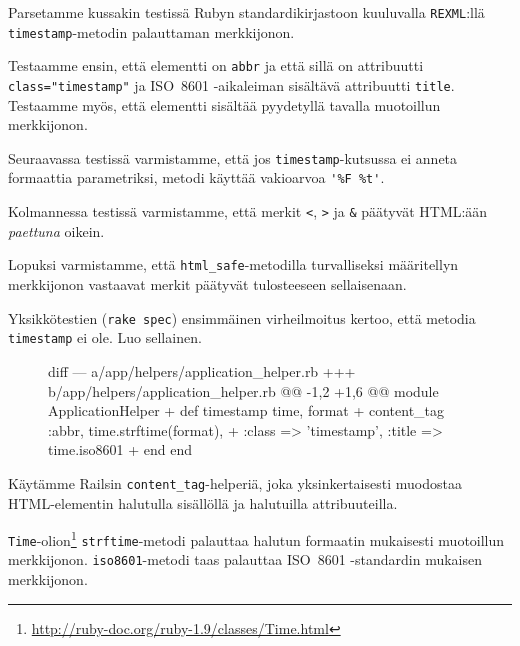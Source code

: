 \documentclass{article}
\newenvironment{myfigure}[1][tbp]{
  \begin{figure}[#1]
    \centering
    \begin{lrbox}{\myfigurebox}
      \begin{minipage}{\textwidth}
}{
      \end{minipage}
    \end{lrbox}
    \colorbox{blue!4}{\usebox{\myfigurebox}}
  \end{figure}
}
\begin{document}
Parsetamme kussakin testissä Rubyn standardikirjastoon kuuluvalla
\texttt{REXML}:llä \texttt{timestamp}-metodin palauttaman merkkijonon.

Testaamme ensin, että elementti on \texttt{abbr} ja että sillä on attribuutti
\texttt{class="timestamp"} ja ISO~8601 -aikaleiman sisältävä attribuutti
\texttt{title}. Testaamme myös, että elementti sisältää pyydetyllä tavalla
muotoillun merkkijonon.

Seuraavassa testissä varmistamme, että jos \texttt{timestamp}-kutsussa ei
anneta formaattia parametriksi, metodi käyttää vakioarvoa \verb!'%F %t'!.

Kolmannessa testissä varmistamme, että merkit \texttt{<}, \texttt{>} ja
\texttt{\&} päätyvät HTML:ään \emph{paettuna} oikein.

Lopuksi varmistamme, että \texttt{html\_safe}-metodilla turvalliseksi
määritellyn merkkijonon vastaavat merkit päätyvät tulosteeseen sellaisenaan.

\begin{samepage}
Yksikkötestien (\texttt{rake spec}) ensimmäinen virheilmoitus kertoo, että
metodia \texttt{timestamp} ei ole. Luo sellainen.

\begin{myfigure}[H]
\begin{pygmented}{diff}
--- a/app/helpers/application_helper.rb
+++ b/app/helpers/application_helper.rb
@@ -1,2 +1,6 @@
 module ApplicationHelper
+  def timestamp time, format
+    content_tag :abbr, time.strftime(format),
+                :class => 'timestamp', :title => time.iso8601
+  end
 end
\end{pygmented}
\end{myfigure}
\end{samepage}

Käytämme Railsin \texttt{content\_tag}-helperiä, joka yksinkertaisesti
muodostaa HTML-elementin halutulla sisällöllä ja halutuilla attribuuteilla.

\texttt{Time}-olion\footnote{\url{http://ruby-doc.org/ruby-1.9/classes/Time.html}}
\texttt{strftime}-metodi palauttaa halutun formaatin mukaisesti muotoillun
merkkijonon. \texttt{iso8601}-metodi taas palauttaa ISO~8601 -standardin
mukaisen merkkijonon.
\end{document}
